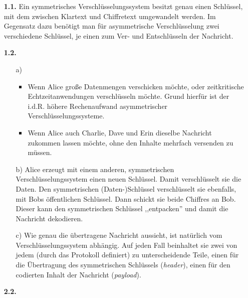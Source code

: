 \documentclass[a4paper,11pt]{article}
\author{\authorinfo}
\title{\titleinfo}
\date{\today}
\begin{document}
\maketitle

\begin{enumerate}

\item[\textbf{1.1.}]
    Ein symmetrisches Verschlüsselungssystem besitzt genau einen Schlüssel, mit dem zwischen Klartext und Chiffretext umgewandelt werden. Im Gegensatz dazu benötigt man für asymmetrische Verschlüsselung zwei verschiedene Schlüssel, je einen zum Ver- und Entschlüsseln der Nachricht.

\item[\textbf{1.2.}]
    \begin{itemize}
        \item[a)]
            \begin{itemize}
                \item Wenn Alice große Datenmengen verschicken möchte, oder zeitkritische Echtzeitanwendungen verschlüsseln möchte. Grund hierfür ist der i.d.R. höhere Rechenaufwand asymmetrischer Verschlüsselungssysteme.
                \item Wenn Alice auch Charlie, Dave und Erin dieselbe Nachricht zukommen lassen möchte, ohne den Inhalte mehrfach versenden zu müssen.
            \end{itemize}

        \item[b)]
            Alice erzeugt mit einem anderen, symmetrischen Verschlüsselungssystem einen neuen Schlüssel. Damit verschlüsselt sie die Daten. Den symmetrischen (Daten-)Schlüssel verschlüsselt sie ebenfalls, mit Bobs öffentlichen Schlüssel. Dann schickt sie beide Chiffres an Bob. Dieser kann den symmetrischen Schlüssel ,,entpacken'' und damit die Nachricht dekodieren.

        \item[c)]
            Wie genau die übertragene Nachricht aussieht, ist natürlich vom Verschlüsselungssystem abhängig. Auf jeden Fall beinhaltet sie zwei von jedem (durch das Protokoll definiert) zu unterscheidende Teile, einen für die Übertragung des symmetrischen Schlüssels (\emph{header}), einen für den codierten Inhalt der Nachricht (\emph{payload}).

    \end{itemize}

\item[\textbf{2.2.}]


\end{enumerate}
\end{document}
